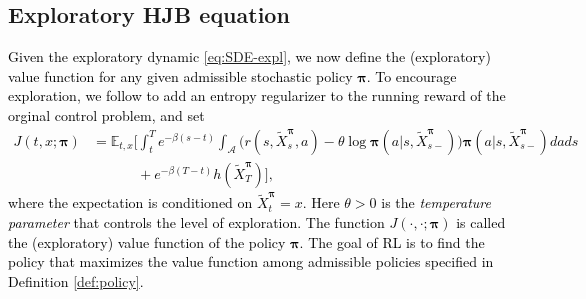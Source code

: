 \documentclass[11pt]{article}
\newcommand{\1}{\mathbbm{1}}
\newcommand{\bpi}{\boldsymbol{\pi}}
\newcommand{\rev}[1]{\textcolor{black}{{#1}}} %
\begin{document}





\subsection{Exploratory HJB equation}
\rev{Given the exploratory dynamic \eqref{eq:SDE-expl}, we now define the (exploratory) value function for any given admissible stochastic policy $\bpi$. To encourage exploration, we follow \cite{wang2020reinforcement} to add an entropy regularizer to the running reward of the orginal control problem, and set
\begin{align}
	J(t, x; \bpi) & = \mathbb{E}_{t,x} \bigg[  \int_t^T  e^{-\beta (s-t)} \int_{\mathcal{A}}\big( r(s, \tilde X_s^{\bpi}, a) - \theta \log\bpi(a|s, \tilde X_{s-}^{\bpi})\big)\bpi(a|s, \tilde X_{s-}^{\bpi})da ds\\
	&\quad\quad\quad~ +  e^{-\beta (T-t) } h( \tilde X_T^{\bpi} )\bigg], \label{eq:J2}
\end{align}
where the expectation is conditioned on $\tilde X_t^{\bpi} =x$. Here $\theta>0$ is the {\it temperature parameter} that controls the level of exploration. The function $J(\cdot, \cdot; \bpi)$ is called the (exploratory) value function of the policy $\bpi$. The goal of RL is to find the policy that maximizes the value function among admissible policies specified in Definition \ref{def:policy}. }
\end{document}
